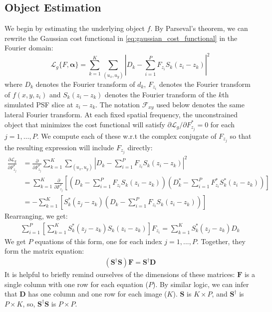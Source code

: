 \documentclass{article}
\begin{document}
\subsection{Object Estimation}
We begin by estimating the underlying object $f$. By Parseval's theorem, we can rewrite the Gaussian cost functional in \autoref{eq:gaussian_cost_functional} in the Fourier domain:
\begin{equation}
\mathcal{L}_g \{F, \bm{\alpha}\} = \sum_{k=1}^K \sum_{(u_x, u_y)} \left| D_k - \sum_{i=1}^P F_{z_i} S_k (z_i - z_k)\right|^2
\label{eq:gaussian_cost_functional_fourier}
\end{equation}
where $D_k$ denotes the Fourier transform of $d_k$, $F_{z_i}$ denotes the Fourier transform of $f(x, y, z_i)$ and $S_k(z_i - z_k)$ denotes the Fourier transform of the $k$th simulated PSF slice at $z_i - z_k$. The notation $\mathcal{F}_{xy}$ used below denotes the same lateral Fourier transform.
At each fixed spatial frequency, the unconstrained object that minimizes the cost functional will satisfy $\partial \mathcal{L}_g/ \partial F_{z_j}^* = 0$ for each $j=1,\ldots,P$. We compute each of these w.r.t the complex conjugate of $F_{z_j}$ so that the resulting expression will include $F_{z_j}$ directly:
\begin{align}
\frac{\partial \mathcal{L}_g}{\partial F_{z_j}^*} &= \frac{\partial}{\partial F_{z_j}^*} \sum_{k=1}^K \sum_{(u_x, u_y)} \left| D_k - \sum_{i=1}^P F_{z_i} S_k (z_i - z_k)\right|^2 \\
&=  \sum_{k=1}^K \frac{\partial}{\partial F_{z_j}^*} \left[ \left(D_k - \sum_{i=1}^P F_{z_i} S_k (z_i - z_k)\right) \left(D^*_k - \sum_{i=1}^P F^*_{z_i} S^*_k (z_i - z_k)\right) \right] \\
&=  - \sum_{k=1}^K \left[ S_k^*(z_j- z_k) \left(D_k - \sum_{i=1}^P F_{z_i} S_k (z_i - z_k)\right) \right]
\end{align}
Rearranging, we get:
\begin{align}
\sum_{i=1}^P \left[\sum_{k=1}^K S_k^*(z_j - z_k) S_k(z_i - z_k)  \right] F_{z_i} = \sum_{k=1}^K S_k^*(z_j - z_k) D_k
\label{eq:optimize_for_f}
\end{align}
We get $P$ equations of this form, one for each index $j=1,...,P$. Together, they form the matrix equation:
\begin{align}
(\mathbf{S}^\dagger \mathbf{S}) \mathbf{F} = \mathbf{S}^\dagger \mathbf{D}
\end{align}
It is helpful to briefly remind ourselves of the dimensions of these matrices: $\mathbf{F}$ is a single column with one row for each equation ($P$). By similar logic, we can infer that $\mathbf{D}$ has one column and one row for each image ($K$). $\mathbf{S}$ is $K \times P$, and $\mathbf{S}^\dagger$ is $P \times K$, so, $\mathbf{S}^\dagger \mathbf{S}$ is $P \times P$.
\end{document}
